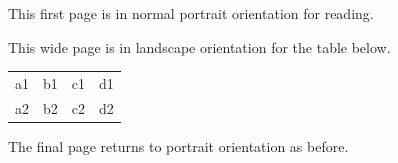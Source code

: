 \documentclass{article}
\begin{document}
This first page is in normal portrait orientation for reading.
\begin{landscape}
This wide page is in landscape orientation for the table below.
\begin{tabular}{cccc}
a1 & b1 & c1 & d1 \\
a2 & b2 & c2 & d2 \\
\end{tabular}
\end{landscape}
The final page returns to portrait orientation as before.
\end{document}
